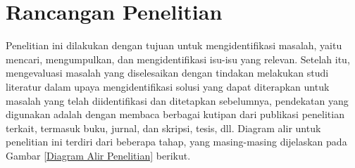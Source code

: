         








\section{Rancangan Penelitian}

   Penelitian ini dilakukan dengan tujuan untuk mengidentifikasi  masalah, yaitu mencari, mengumpulkan, dan mengidentifikasi isu-isu yang relevan. Setelah itu, mengevaluasi masalah yang diselesaikan dengan tindakan melakukan studi literatur dalam upaya mengidentifikasi solusi yang dapat diterapkan untuk masalah yang telah diidentifikasi dan ditetapkan sebelumnya, pendekatan yang digunakan adalah dengan membaca berbagai kutipan dari publikasi penelitian terkait, termasuk buku, jurnal, dan skripsi, tesis, dll. Diagram alir untuk penelitian ini terdiri dari beberapa tahap, yang masing-masing dijelaskan pada Gambar \ref{Diagram Alir Penelitian} berikut. 



